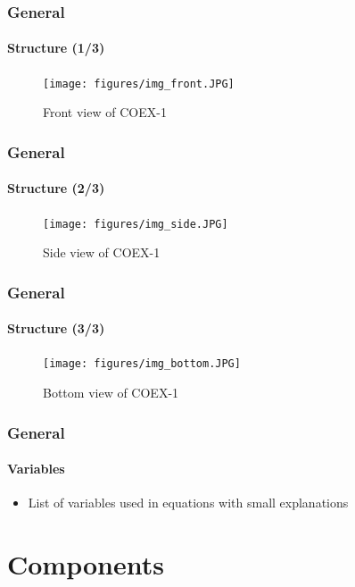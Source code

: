 \documentclass{beamer}
\begin{document}

\begin{frame}
\frametitle{General}
\framesubtitle{Structure (1/3)}
\begin{figure}[hbtp]
\centering
\texttt{[image: figures/img\_front.JPG]}
\caption{Front view of COEX-1}
\end{figure}
\end{frame}


\begin{frame}
\frametitle{General}
\framesubtitle{Structure (2/3)}
\begin{figure}[hbtp]
\centering
\texttt{[image: figures/img\_side.JPG]}
\caption{Side view of COEX-1}
\end{figure}
\end{frame}


\begin{frame}
\frametitle{General}
\framesubtitle{Structure (3/3)}
\begin{figure}[hbtp]
\centering
\texttt{[image: figures/img\_bottom.JPG]}
\caption{Bottom view of COEX-1}
\end{figure}
\end{frame}


\begin{frame}
\frametitle{General}
\framesubtitle{Variables}
\begin{itemize}
\item List of variables used in equations with small explanations
\end{itemize}
\end{frame}

\section{Components} 
\end{document}
